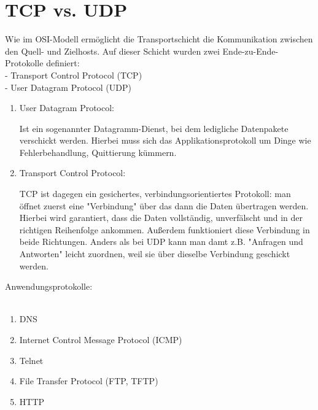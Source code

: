 \documentclass[11pt]{article}
\begin{document}
    \section{TCP vs. UDP}

    Wie im OSI-Modell ermöglicht die Transportschicht die Kommunikation
    zwischen den Quell- und Zielhosts. Auf dieser Schicht wurden zwei
    Ende-zu-Ende-Protokolle definiert:\\

    - Transport Control Protocol (TCP)\\

    - User Datagram Protocol (UDP)\\


    \begin{enumerate}

        \item User Datagram Protocol:\\
        \begin{addmargin}[1em]{1em}

            Ist ein sogenannter Datagramm-Dienst, bei dem ledigliche
            Datenpakete verschickt werden. Hierbei muss sich das
            Applikationsprotokoll um Dinge wie Fehlerbehandlung, Quittierung kümmern.

        \end{addmargin}

        \item Transport Control Protocol:\\

        \begin{addmargin}[1em]{1em}

            TCP ist dagegen ein gesichertes, verbindungsorientiertes Protokoll:
            man öffnet zuerst eine "Verbindung" über das dann die Daten übertragen
            werden. Hierbei wird garantiert, dass die Daten vollständig, unverfälscht
            und in der richtigen Reihenfolge ankommen.
            Außerdem funktioniert diese Verbindung in beide Richtungen.
            Anders als bei UDP kann man damt z.B. "Anfragen und Antworten" leicht zuordnen,
            weil sie über dieselbe Verbindung geschickt werden.\\

        \end{addmargin}
    \end{enumerate}

    Anwendungsprotokolle:\\\\

    \begin{addmargin}[1em]{1em}
        \begin{enumerate}

            \item DNS\\
            \item Internet Control Message Protocol (ICMP)\\
            \item Telnet\\
            \item File Transfer Protocol (FTP, TFTP)\\
            \item HTTP\\

        \end{enumerate}
    \end{addmargin}
\end{document}
